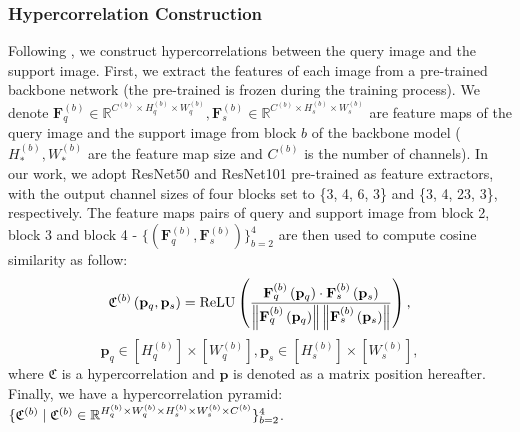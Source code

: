 \documentclass{ieeeaccess}
\newcommand{\congtt}[1]{\textcolor{red}{#1}}
\begin{document}
\subsubsection{Hypercorrelation Construction}
Following \cite{HSNet}, we construct hypercorrelations between the query image and the support image. First, we extract the features of each image from a pre-trained backbone network (the pre-trained  is frozen during the training process). We denote $\mathbf{F}_{q}^{(b)} \in \mathbb{R}^{C^{(b)} \times H^{(b)}_{q} \times W^{(b)}_{q}} , \mathbf{F}_{s}^{(b)} \in \mathbb{R}^{C^{(b)} \times H^{(b)}_{s} \times W^{(b)}_{s}}$ are feature maps of the query image and the support image from block $b$ of the backbone model ($H^{(b)}_{*}, W^{(b)}_{*}$ are the feature map size and $C^{(b)}$ is the number of channels). In our work, we adopt ResNet50 and ResNet101 pre-trained as feature extractors, with the output channel sizes of four blocks set to \{3, 4, 6, 3\} and \{3, 4, 23, 3\}, respectively. The feature maps pairs of query and support image from block 2, block 3 and block 4 - $\{(\mathbf{F}_{q}^{(b)}, \mathbf{F}_{s}^{(b)})\}_{b=2}^4$ are then used  to compute cosine similarity as follow: 
\begin{equation}
\textbf{\mathfrak{C}}^{(b)}\left(\mathbf{p}_{q}, \mathbf{p}_{s}\right)=\operatorname{ReLU}\left(\frac{\mathbf{F}_{q}^{(b)}\left(\mathbf{p}_{q}\right) \cdot \mathbf{F}_{s}^{(b)}\left(\mathbf{p}_{s}\right)}{\left\|\mathbf{F}_{q}^{(b)}\left(\mathbf{p}_{q}\right)\right\|\left\|\mathbf{F}_{s}^{(b)}\left(\mathbf{p}_{s}\right)\right\|}\right),
\end{equation}
\begin{equation*}
\mathbf{p}_q \in[H^{(b)}_q] \times[W^{(b)}_q], \mathbf{p}_s \in[H^{(b)}_s] \times[W^{(b)}_s],
\end{equation*}
 where $\mathfrak{C}$ is a hypercorrelation and $\mathbf{p}$ is denoted as a matrix position hereafter. Finally, we have a hypercorrelation pyramid: $\{\textbf{\mathfrak{C}}^{(b)} \mid \textbf{\mathfrak{C}}^{(b)} \in \mathbb{R}^{H^{(b)}_{q} \times W^{(b)}_{q} \times H^{(b)}_{s} \times W^{(b)}_{s} \times C^{(b)}}\}^4_{b=2}$.
\end{document}
